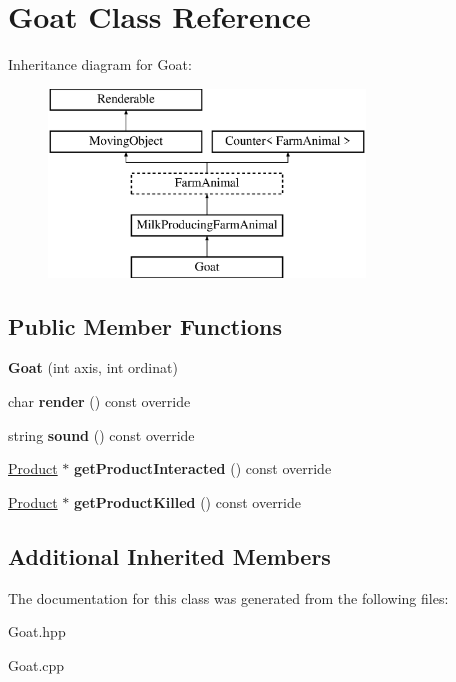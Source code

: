 \hypertarget{class_goat}{}\section{Goat Class Reference}
\label{class_goat}
Inheritance diagram for Goat\+:\begin{figure}[H]
\begin{center}
\leavevmode
\includegraphics[height=5.000000cm]{class_goat}
\end{center}
\end{figure}
\subsection*{Public Member Functions}
\begin{DoxyCompactItemize}
\item 
\mbox{\label{class_goat_a9e7f41a6dbcbbe71ff00dbf87699a0e2}} 
{\bfseries Goat} (int axis, int ordinat)
\item 
\mbox{\label{class_goat_ac0a538ea14fc410514170ce69ffc4238}} 
char {\bfseries render} () const override
\item 
\mbox{\label{class_goat_a8aea97bfa7992f942c0874a8d56bf21a}} 
string {\bfseries sound} () const override
\item 
\mbox{\label{class_goat_aa7442a2483d61aed3c2b7c3ebd6c584f}} 
\mbox{\hyperlink{class_product}{Product}} $\ast$ {\bfseries get\+Product\+Interacted} () const override
\item 
\mbox{\label{class_goat_a897e77396b5aecaf518f974527e309b6}} 
\mbox{\hyperlink{class_product}{Product}} $\ast$ {\bfseries get\+Product\+Killed} () const override
\end{DoxyCompactItemize}
\subsection*{Additional Inherited Members}


The documentation for this class was generated from the following files\+:\begin{DoxyCompactItemize}
\item 
Goat.\+hpp\item 
Goat.\+cpp\end{DoxyCompactItemize}
